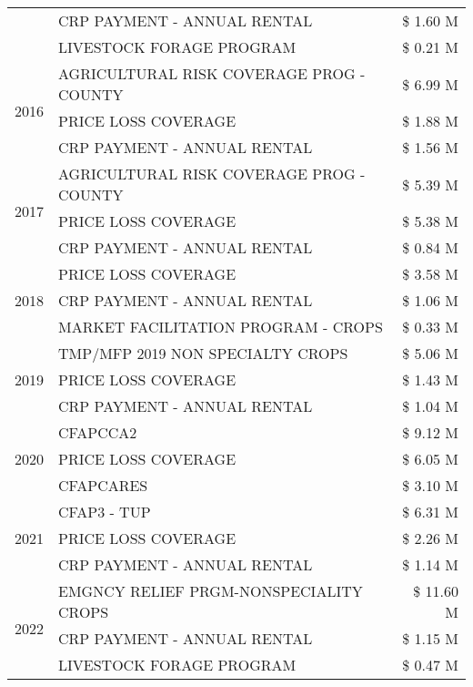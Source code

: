 \begin{tabular}{llr}
 & CRP PAYMENT - ANNUAL RENTAL & \$ 1.60 M \\
 & LIVESTOCK FORAGE PROGRAM & \$ 0.21 M \\
\cline{1-3}
\multirow[t]{3}{*}{2016} & AGRICULTURAL RISK COVERAGE PROG - COUNTY & \$ 6.99 M \\
 & PRICE LOSS COVERAGE & \$ 1.88 M \\
 & CRP PAYMENT - ANNUAL RENTAL & \$ 1.56 M \\
\cline{1-3}
\multirow[t]{3}{*}{2017} & AGRICULTURAL RISK COVERAGE PROG - COUNTY & \$ 5.39 M \\
 & PRICE LOSS COVERAGE & \$ 5.38 M \\
 & CRP PAYMENT - ANNUAL RENTAL & \$ 0.84 M \\
\cline{1-3}
\multirow[t]{3}{*}{2018} & PRICE LOSS COVERAGE & \$ 3.58 M \\
 & CRP PAYMENT - ANNUAL RENTAL & \$ 1.06 M \\
 & MARKET FACILITATION PROGRAM - CROPS & \$ 0.33 M \\
\cline{1-3}
\multirow[t]{3}{*}{2019} & TMP/MFP 2019 NON SPECIALTY CROPS & \$ 5.06 M \\
 & PRICE LOSS COVERAGE & \$ 1.43 M \\
 & CRP PAYMENT - ANNUAL RENTAL & \$ 1.04 M \\
\cline{1-3}
\multirow[t]{3}{*}{2020} & CFAPCCA2 & \$ 9.12 M \\
 & PRICE LOSS COVERAGE & \$ 6.05 M \\
 & CFAPCARES & \$ 3.10 M \\
\cline{1-3}
\multirow[t]{3}{*}{2021} & CFAP3 - TUP & \$ 6.31 M \\
 & PRICE LOSS COVERAGE & \$ 2.26 M \\
 & CRP PAYMENT - ANNUAL RENTAL & \$ 1.14 M \\
\cline{1-3}
\multirow[t]{3}{*}{2022} & EMGNCY RELIEF PRGM-NONSPECIALITY CROPS & \$ 11.60 M \\
 & CRP PAYMENT - ANNUAL RENTAL & \$ 1.15 M \\
 & LIVESTOCK FORAGE PROGRAM & \$ 0.47 M \\
\cline{1-3}
\bottomrule
\end{tabular}
